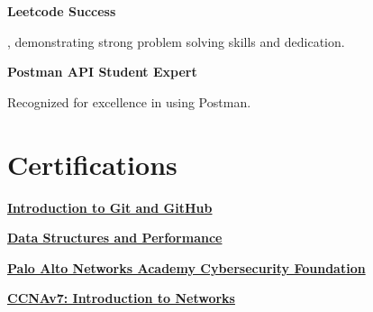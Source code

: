 \documentclass[letterpaper,10pt]{article}
\newcommand{\heading}[2]{
  \hspace{10pt}#1\hfill#2\\
}
\newcommand{\headingBf}[2]{
  \heading{\textbf{#1}}{\textbf{#2}}
}
\newenvironment{resume_list}{
  \vspace{-7pt}
  \begin{itemize}[itemsep=-2px, parsep=1pt, leftmargin=30pt]
}{
  \end{itemize}
}
\begin{document}
\headingBf{Leetcode Success \href{https://www.leetcode.com/1md3nd}{\small\textit{\color{gray}{Link}}}}{}
\begin{resume_list}
  \item \textbf{\color{accentTitle}{Solved over 750 algorithm problems}}, demonstrating strong problem solving skills and dedication.
\end{resume_list}

\headingBf{Postman API Student Expert}{}
\begin{resume_list}
  \item Recognized for excellence in \textbf{\color{accentTitle}{API design, testing, and automation}} using Postman.
\end{resume_list}

\section{Certifications}
\begin{resume_list}  
  \item \headingBf{\href{https://www.coursera.org/account/accomplishments/verify/VAXY9EEWXD3C}{Introduction to Git and GitHub}}{}
  \item \headingBf{\href{https://www.coursera.org/account/accomplishments/verify/MEHYBBVAYE8E}{Data Structures and Performance}}{}
  \item \headingBf{\href{https://www.coursera.org/account/accomplishments/verify/R73VUS4L44RN}{Palo Alto Networks Academy Cybersecurity Foundation}}{}
  \item \headingBf{\href{https://drive.google.com/file/d/15n4G1_3d75gbxfikhzodotRZVXInxqhJ/view?usp=sharing}{CCNAv7: Introduction to Networks}}{}
\end{resume_list}
\end{document}
